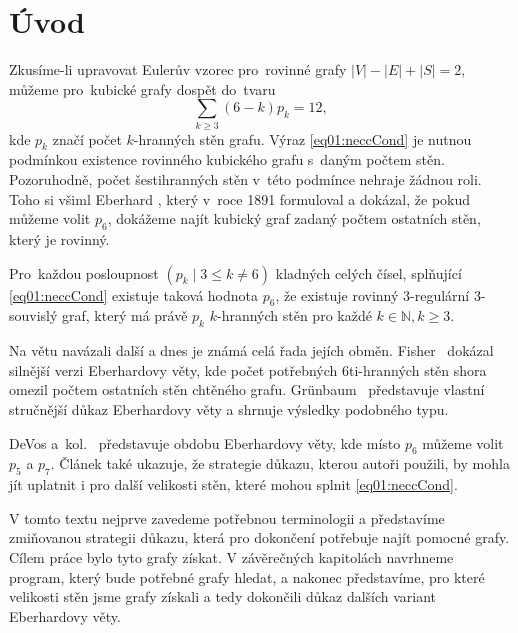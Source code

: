 \chapter*{Úvod}

Zkusíme-li upravovat Eulerův vzorec pro~rovinné grafy
$|V|-|E|+|S|=2$, můžeme pro~kubické grafy dospět do~tvaru 
\begin{equation}\label{eq01:neccCond}
\sum_{k \geq 3}{(6-k)p_k}=12,
\end{equation}
kde $p_k$ značí počet $k$-hranných stěn grafu. Výraz \eqref{eq01:neccCond} je nutnou podmínkou existence rovinného kubického grafu s~daným počtem stěn. Pozoruhodně, počet šestihranných stěn v~této podmínce nehraje žádnou roli. Toho si všiml Eberhard \cite{Eberhard91}, který v~roce 1891 formuloval a dokázal, že pokud můžeme volit $p_6$, dokážeme najít kubický graf zadaný počtem ostatních stěn, který je rovinný.

\begin{veta}\label{veta:Eberhard}
Pro~každou posloupnost $(p_k \mid 3 \leq k \neq 6)$ kladných celých čísel, splňující \eqref{eq01:neccCond} existuje taková hodnota $p_6$, že existuje rovinný 3-regulární 3-souvislý graf, který má právě $p_k$ $k$-hranných stěn pro každé $k \in \mathbb{N}, k \geq 3 $.
\end{veta}

Na větu navázali další a dnes je známá celá řada jejích obměn. Fisher~\cite{Fisher74} dokázal silnější verzi Eberhardovy věty, kde počet potřebných 6ti-hranných stěn shora omezil počtem ostatních stěn chtěného grafu. Grünbaum~\cite{Grunbaum} představuje vlastní stručnější důkaz Eberhardovy věty a shrnuje výsledky podobného typu. 

DeVos a~kol.~\cite{Samal09} představuje obdobu Eberhardovy věty, kde místo $p_6$ můžeme volit $p_5$ a $p_7$. Článek také ukazuje, že strategie důkazu, kterou autoři použili, by mohla jít uplatnit i pro další velikosti stěn, které mohou splnit \eqref{eq01:neccCond}. 

V tomto textu nejprve zavedeme potřebnou terminologii a představíme zmiňovanou strategii důkazu, která pro dokončení potřebuje najít pomocné grafy. Cílem práce bylo tyto grafy získat. V závěrečných kapitolách navrhneme program, který bude potřebné grafy hledat, a nakonec představíme, pro které velikosti stěn jsme grafy získali a tedy dokončili důkaz dalších variant Eberhardovy věty.
